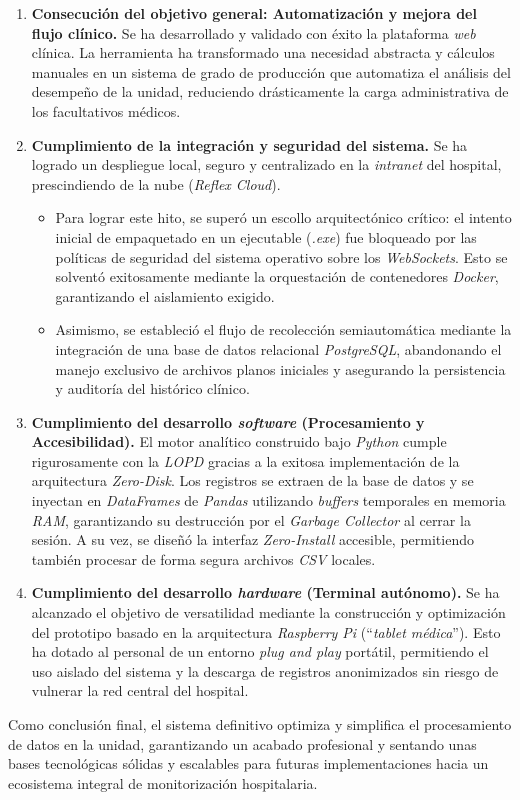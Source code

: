 \begin{enumerate}
    \item \textbf{Consecución del objetivo general: Automatización y mejora del flujo clínico.} Se ha desarrollado y validado con éxito la plataforma \textit{web} clínica. La herramienta ha transformado una necesidad abstracta y cálculos manuales en un sistema de grado de producción que automatiza el análisis del desempeño de la unidad, reduciendo drásticamente la carga administrativa de los facultativos médicos.

    \item \textbf{Cumplimiento de la integración y seguridad del sistema.} Se ha logrado un despliegue local, seguro y centralizado en la \textit{intranet} del hospital, prescindiendo de la nube (\textit{Reflex Cloud}). 
    \begin{itemize}
        \item Para lograr este hito, se superó un escollo arquitectónico crítico: el intento inicial de empaquetado en un ejecutable (\textit{.exe}) fue bloqueado por las políticas de seguridad del sistema operativo sobre los \textit{WebSockets}. Esto se solventó exitosamente mediante la orquestación de contenedores \textit{Docker}, garantizando el aislamiento exigido.
        \item Asimismo, se estableció el flujo de recolección semiautomática mediante la integración de una base de datos relacional \textit{PostgreSQL}, abandonando el manejo exclusivo de archivos planos iniciales y asegurando la persistencia y auditoría del histórico clínico.
    \end{itemize}

    \item \textbf{Cumplimiento del desarrollo \textit{software} (Procesamiento y Accesibilidad).} El motor analítico construido bajo \textit{Python} cumple rigurosamente con la \textit{LOPD} gracias a la exitosa implementación de la arquitectura \textit{Zero-Disk}. Los registros se extraen de la base de datos y se inyectan en \textit{DataFrames} de \textit{Pandas} utilizando \textit{buffers} temporales en memoria \textit{RAM}, garantizando su destrucción por el \textit{Garbage Collector} al cerrar la sesión. A su vez, se diseñó la interfaz \textit{Zero-Install} accesible, permitiendo también procesar de forma segura archivos \textit{CSV} locales.

    \item \textbf{Cumplimiento del desarrollo \textit{hardware} (Terminal autónomo).} Se ha alcanzado el objetivo de versatilidad mediante la construcción y optimización del prototipo basado en la arquitectura \textit{Raspberry Pi} (``\textit{tablet médica}''). Esto ha dotado al personal de un entorno \textit{plug and play} portátil, permitiendo el uso aislado del sistema y la descarga de registros anonimizados sin riesgo de vulnerar la red central del hospital.
\end{enumerate}

Como conclusión final, el sistema definitivo optimiza y simplifica el procesamiento de datos en la unidad, garantizando un acabado profesional y sentando unas bases tecnológicas sólidas y escalables para futuras implementaciones hacia un ecosistema integral de monitorización hospitalaria.



